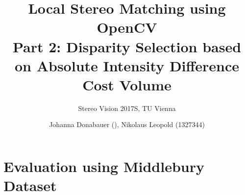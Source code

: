 \documentclass[english, paper=a4]{scrartcl}
\begin{document}
\graphicspath{{images/}}

\title{Local Stereo Matching using OpenCV\\Part 2: Disparity Selection based on Absolute Intensity Difference Cost Volume} 
\subtitle{Stereo Vision 2017S, TU Vienna} 
\author{Johanna Donabauer (), Nikolaus Leopold (1327344)}
\maketitle

\section{Evaluation using Middlebury Dataset}
\end{document}
